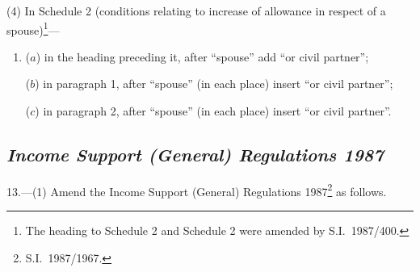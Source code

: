\documentclass[12pt,a4paper]{article}
\begin{document}
(4) In Schedule 2 (conditions relating to increase of allowance in respect of a spouse)\footnote{The heading to Schedule 2 and Schedule 2 were amended by S.I.\ 1987/400.}—
\begin{enumerate}\item[]
($a$) in the heading preceding it, after “spouse” add “or civil partner”;

($b$) in paragraph 1, after “spouse” (in each place) insert “or civil partner”;

($c$) in paragraph 2, after “spouse” (in each place) insert “or civil partner”.
\end{enumerate}

\subsection*{\itshape Income Support (General) Regulations 1987}

13.---(1)  Amend the Income Support (General) Regulations 1987\footnote{S.I.\ 1987/1967.} as follows.
\end{document}

